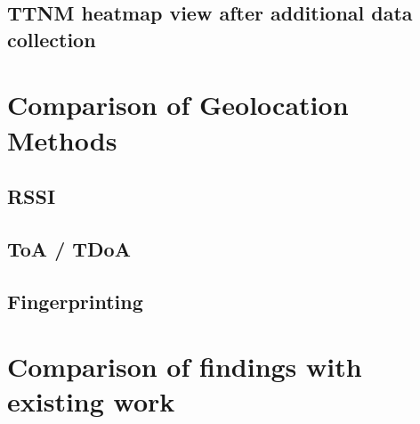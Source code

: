 

\subsection{\acl{TTNM} heatmap view after additional data collection}\label{sec:ttm_heatmap_after}


\section{Comparison of Geolocation Methods}


\subsection{\acf{RSSI}}


\subsection{\acf{ToA} / \acf{TDoA}}


\subsection{Fingerprinting}



\section{Comparison of findings with existing work}


